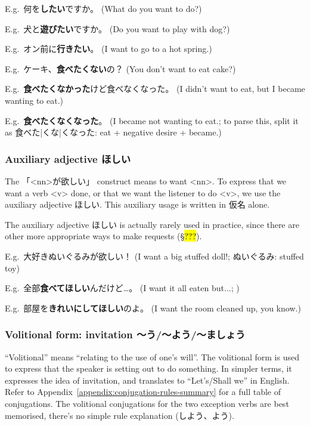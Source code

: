 \documentclass[../nihongo-gakushuu-kyouzai-grammar.tex]{subfiles}
\begin{document}
E.g.\ 何を\textbf{したい}ですか。 (What do you want to do?)

E.g.\ 犬と\textbf{遊びたい}ですか。 (Do you want to play with dog?)

E.g.\ オン前に\textbf{行きたい}。 (I want to go to a hot spring.)

E.g.\ ケーキ、\textbf{食べたくない}の？ (You don't want to eat cake?)

E.g.\ \textbf{食べたくなかった}けど食べなくなった。 (I didn't want to eat, but I became wanting to eat.)

E.g.\ \textbf{食べたくなくなった}。 (I became not wanting to eat.; to parse this, split it as 食べた|くな|くなった: eat + negative desire + became.)


\subsubsection{Auxiliary adjective ほしい} \label{sec:auxiliary-adjective-hoshii}
The 「<nn>が欲しい」 construct means to want <nn>. To express that we want a verb <v> done, or that we want the listener to do <v>, we use the auxiliary adjective ほしい. This auxiliary usage is written in 仮名 alone.

The auxiliary adjective ほしい is actually rarely used in practice, since there are other more appropriate ways to make requests (\S\hl{???}).

E.g.\ 大好きぬいぐるみが欲しい！ (I want a big stuffed doll!; ぬいぐるみ: stuffed toy)

E.g.\ 全部\textbf{食べてほしい}んだけど\dots。 (I want it all eaten but...; )

E.g.\ 部屋を\textbf{きれいにしてほしい}のよ。 (I want the room cleaned up, you know.)


\subsubsection{Volitional form: invitation 〜う/〜よう/〜ましょう} \label{sec:volitional-form}
``Volitional'' means ``relating to the use of one's will''. The volitional form is used to express that the speaker is setting out to do something. In simpler terms, it expresses the idea of invitation, and translates to ``Let's/Shall we'' in English. Refer to Appendix~\ref{appendix:conjugation-rules-summary} for a full table of conjugations. The volitional conjugations for the two exception verbs are best memorised, there's no simple rule explanation (しよう、よう).
\end{document}
